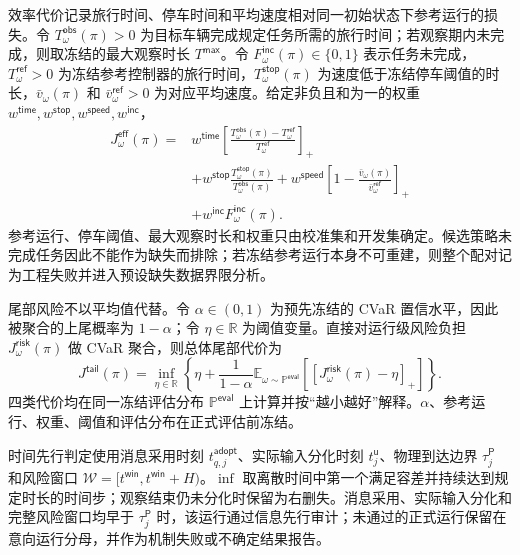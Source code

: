 \documentclass[10pt,a4paper,twocolumn]{article}
\begin{document}
效率代价记录旅行时间、停车时间和平均速度相对同一初始状态下参考运行的损失。令 $T_{\omega}^{\mathsf{obs}}(\pi)>0$ 为目标车辆完成规定任务所需的旅行时间；若观察期内未完成，则取冻结的最大观察时长 $T^{\mathsf{max}}$。令 $F_{\omega}^{\mathsf{inc}}(\pi)\in\{0,1\}$ 表示任务未完成，$T_{\omega}^{\mathsf{ref}}>0$ 为冻结参考控制器的旅行时间，$T_{\omega}^{\mathsf{stop}}(\pi)$ 为速度低于冻结停车阈值的时长，$\bar v_{\omega}(\pi)$ 和 $\bar v_{\omega}^{\mathsf{ref}}>0$ 为对应平均速度。给定非负且和为一的权重 $w^{\mathsf{time}},w^{\mathsf{stop}},w^{\mathsf{speed}},w^{\mathsf{inc}}$，
\begin{equation*}
\begin{aligned}
J_{\omega}^{\mathsf{eff}}(\pi)
={}&w^{\mathsf{time}}\left[
\frac{T_{\omega}^{\mathsf{obs}}(\pi)-T_{\omega}^{\mathsf{ref}}}
{T_{\omega}^{\mathsf{ref}}}\right]_+\\
&+w^{\mathsf{stop}}\frac{T_{\omega}^{\mathsf{stop}}(\pi)}
{T_{\omega}^{\mathsf{obs}}(\pi)}
+w^{\mathsf{speed}}\left[
1-\frac{\bar v_{\omega}(\pi)}{\bar v_{\omega}^{\mathsf{ref}}}\right]_+\\
&+w^{\mathsf{inc}}F_{\omega}^{\mathsf{inc}}(\pi).
\end{aligned}
\end{equation*}
参考运行、停车阈值、最大观察时长和权重只由校准集和开发集确定。候选策略未完成任务因此不能作为缺失而排除；若冻结参考运行本身不可重建，则整个配对记为工程失败并进入预设缺失数据界限分析。

尾部风险不以平均值代替。令 $\alpha\in(0,1)$ 为预先冻结的 CVaR 置信水平，因此被聚合的上尾概率为 $1-\alpha$；令 $\eta\in\mathbb R$ 为阈值变量。直接对运行级风险负担 $J_{\omega}^{\mathsf{risk}}(\pi)$ 做 CVaR 聚合，则总体尾部代价为
\begin{equation*}
J^{\mathsf{tail}}(\pi)=
\inf_{\eta\in\mathbb R}
\left\{\eta+\frac{1}{1-\alpha}
\mathbb E_{\omega\sim\mathbb P^{\mathsf{eval}}}\!\left[\left[J_{\omega}^{\mathsf{risk}}(\pi)-\eta\right]_+\right]\right\}.
\end{equation*}
四类代价均在同一冻结评估分布 $\mathbb P^{\mathsf{eval}}$ 上计算并按“越小越好”解释。$\alpha$、参考运行、权重、阈值和评估分布在正式评估前冻结。

时间先行判定使用消息采用时刻 $t_{q,j}^{\mathsf{adopt}}$、实际输入分化时刻 $t_j^{\mathsf u}$、物理到达边界 $\tau_j^{\mathsf P}$ 和风险窗口 $\mathcal W=[t^{\mathsf{win}},t^{\mathsf{win}}+H)$。$\inf$ 取离散时间中第一个满足容差并持续达到规定时长的时间步；观察结束仍未分化时保留为右删失。消息采用、实际输入分化和完整风险窗口均早于 $\tau_j^{\mathsf P}$ 时，该运行通过信息先行审计；未通过的正式运行保留在意向运行分母，并作为机制失败或不确定结果报告。
\end{document}
